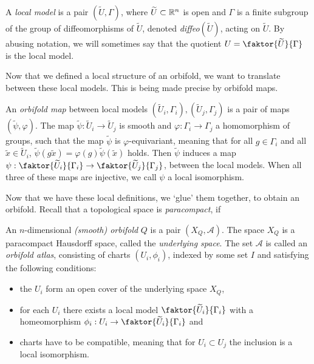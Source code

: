 \begin{definition}
    A \emph{local model} is a pair \((\widetilde{U}, \Gamma)\), where \(\widetilde{U} \subset \mathbb{R}^n\) is open and \(\Gamma\) is a finite subgroup of the group of diffeomorphisms of \(\widetilde{U}\), denoted \emph{diffeo}\((\widetilde{U})\), acting on \(\widetilde{U}\).
    By abusing notation, we will sometimes say that the quotient \(U = \faktor{\widetilde{U}}{\Gamma}\;\) is the local model.
\end{definition}

Now that we defined a local structure of an orbifold, we want to translate between these local models.
This is being made precise by orbifold maps.

\begin{definition}
    An \emph{orbifold map} between local models \((\widetilde{U}_i, \Gamma_i), (\widetilde{U}_j, \Gamma_j)\) is a pair of maps \((\widetilde{\psi}, \varphi)\).
    The map \(\widetilde{\psi} : \widetilde{U}_i \to \widetilde{U}_j\) is smooth and \(\varphi : \Gamma_i \to \Gamma_j\) a homomorphism of groups, such that the map \(\widetilde{\psi}\) is \(\varphi\)-equivariant, meaning that for all \(g \in \Gamma_i\) and all \(\widetilde{x} \in \widetilde{U}_i\), \(\widetilde{\psi}(g\widetilde{x}) = \varphi(g)\widetilde{\psi}(\widetilde{x})\) holds.
    Then \(\widetilde{\psi}\) induces a map \(\psi : \faktor{\widetilde{U}_i}{\Gamma_i} \to \faktor{\widetilde{U}_j}{\Gamma_j}\), between the local models.
    When all three of these maps are injective, we call \(\psi\) a local isomorphism.
\end{definition}

Now that we have these local definitions, we `glue' them together, to obtain an orbifold.
Recall that a topological space is \emph{paracompact}, if 

\begin{definition}
    An \(n\)-dimensional \emph{(smooth) orbifold} \(Q\) is a pair \((X_Q, \mathcal{A})\).
    The space \(X_Q\) is a paracompact Hausdorff space, called the \emph{underlying space}.
    The set \(\mathcal{A}\) is called an \emph{orbifold atlas}, consisting of charts \((U_i, \phi_i)\), indexed by some set \(I\) and satisfying the following conditions:
    \begin{itemize}
        \item the \(U_i\) form an open cover of the underlying space \(X_Q\),\vspace*{-.7em}
        \item for each \(U_i\) there exists a local model \(\faktor{\widetilde{U}_i}{\Gamma_i}\) with a homeomorphism \(\phi_i : U_i \to \faktor{\widetilde{U}_i}{\Gamma_i}\) and
        \item charts have to be compatible, meaning that for \(U_i \subset U_j\) the inclusion is a local isomorphism.
    \end{itemize}
\end{definition}

